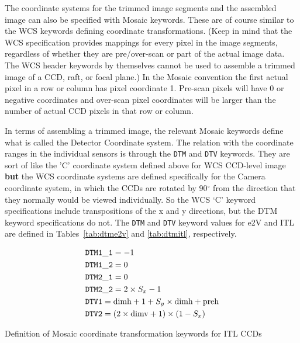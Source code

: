 \documentclass{article}[12pt]
\begin{document}
{The coordinate systems for the trimmed image segments and the assembled image can also be specified with Mosaic keywords.  These are of course similar to the WCS keywords defining coordinate transformations.  (Keep in mind that the WCS specification provides mappings for every pixel in the image segments, regardless of whether they are pre/over-scan or part of the actual image data.  The WCS header keywords by themselves cannot be used to assemble a trimmed image of a CCD, raft, or focal plane.)   In the Mosaic convention the first actual pixel in a row or column has pixel coordinate 1.  Pre-scan pixels will have 0 or negative coordinates and over-scan pixel coordinates will be larger than the number of actual CCD pixels in that row or column.

In terms of assembling a trimmed image, the relevant Mosaic keywords define what is called the Detector Coordinate system.  The relation with the coordinate ranges in the individual sensors is through the {\tt DTM} and {\tt DTV} keywords.  
They are sort of like the 'C' coordinate system defined above for WCS CCD-level image {\bf but} the WCS coordinate systems are defined specifically for the Camera coordinate system, in which the CCDs are rotated by 90$^\circ$ from the direction that they normally would be viewed individually.  So the WCS `C' keyword specifications include transpositions of the x and y directions, but the DTM keyword specifications do not.  The {\tt DTM} and {\tt DTV} keyword values for e2V and ITL are defined in Tables~\ref{tab:dtme2v} and \ref{tab:dtmitl}, respectively.



\begin{table}
\begin{align*}
& {\tt DTM1\_1} = -1 \\
& {\tt DTM1\_2} = 0 \\
& {\tt DTM2\_1} = 0 \\
& {\tt DTM2\_2} = 2 \times S_x - 1 \\
& {\tt DTV1} = {\rm dimh} + 1 + S_y \times {\rm dimh} + {\rm preh}  \\
& {\tt DTV2} = (2 \times {\rm dimv} + 1) \times (1 - S_x) \\
\end{align*}
\caption{Definition of Mosaic coordinate transformation keywords for ITL CCDs\label{tab:dtmitl}}
\end{table}


}
\end{document}
